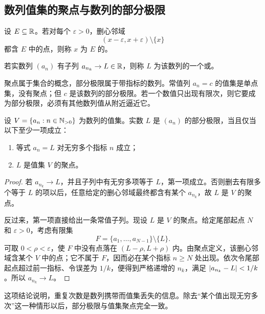 \subsection{数列值集的聚点与数列的部分极限}


\begin{definition}
设 \(E\subseteq\mathbb{R}\)。若对每个 \(\varepsilon>0\)，删心邻域
\[
 (x-\varepsilon,x+\varepsilon)\setminus\{x\}
\]
都含 \(E\) 中的点，则称 \(x\) 为 \(E\) 的。
\end{definition}

\begin{definition}
若实数列 \((a_n)\) 有子列 \(a_{n_k}\to L\in\mathbb{R}\)，则称 \(L\) 为该数列的一个或。
\end{definition}

聚点属于集合的概念，部分极限属于带指标的数列。常值列 \(a_n=c\) 的值集是单点集，没有聚点；但 \(c\) 是该数列的部分极限。若一个数值只出现有限次，则它要成为部分极限，必须有其他数列值从附近逼近它。

\begin{proposition}[部分极限的两种来源]
设 \(V=\{a_n:n\in\mathbb{N}_{>0}\}\) 为数列的值集。实数 \(L\) 是
\((a_n)\) 的部分极限，当且仅当以下至少一项成立：
\begin{enumerate}
 \item 等式 \(a_n=L\) 对无穷多个指标 \(n\) 成立；
 \item \(L\) 是值集 \(V\) 的聚点。
\end{enumerate}
\end{proposition}

\begin{proof}
若 \(a_{n_k}\to L\)，并且子列中有无穷多项等于 \(L\)，第一项成立。否则删去有限多个等于 \(L\) 的项以后，任意给定的删心邻域最终都含有某个 \(a_{n_k}\)，故 \(L\) 是 \(V\) 的聚点。

反过来，第一项直接给出一条常值子列。现设 \(L\) 是 \(V\) 的聚点。给定尾部起点 \(N\) 和 \(\varepsilon>0\)，考虑有限集
\[
 F=\{a_1,\ldots,a_{N-1}\}\setminus\{L\}.
\]
可取 \(0<\rho<\varepsilon\)，使 \(F\) 中没有点落在
\((L-\rho,L+\rho)\) 内。由聚点定义，该删心邻域含某个
\(V\) 中的点；它不属于 \(F\)，因而必在某个指标 \(n\ge N\) 处出现。依次令尾部起点超过前一指标、令误差为 \(1/k\)，便得到严格递增的 \(n_k\)，满足
\(\left|a_{n_k}-L\right|<1/k\)。所以 \(a_{n_k}\to L\)。
\end{proof}

这项结论说明，重复次数是数列携带而值集丢失的信息。除去“某个值出现无穷多次”这一种情形以后，部分极限与值集聚点完全一致。

